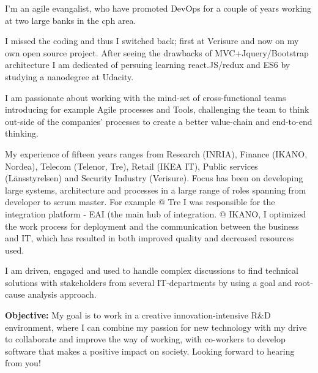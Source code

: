 I’m an agile evangalist, who have promoted DevOps for a couple of years working at two large banks in the cph area.  

I missed the coding and thus I switched back; first at Verisure and now on my own open source project. After seeing the drawbacks of MVC+Jquery/Bootstrap architecture I am dedicated of persuing learning react.JS/redux and ES6 by studying a nanodegree at Udacity. 

I am passionate about working with the mind-set of cross-functional teams introducing for example Agile processes and Tools, challenging the team to think out-side of the companies’ processes to create a better value-chain and end-to-end thinking. 

My experience of fifteen years ranges from Research (INRIA), Finance (IKANO, Nordea), Telecom (Telenor, Tre), Retail (IKEA IT), Public services (Länsstyrelsen) and Security Industry (Verisure). Focus has been on developing large systems, architecture and processes in a large range of roles spanning from developer to scrum master. For example @ Tre I was responsible for the integration platform - EAI (the main hub of integration. @ IKANO, I optimized the work process for deployment and the communication between the business and IT, which has resulted in both improved quality and decreased resources used. 

I am driven, engaged and used to handle complex discussions to find technical solutions with stakeholders from several IT-departments by using a goal and root-cause analysis approach. 


\newline\textbf{Objective:}
My goal is to work in a creative innovation-intensive R&D environment, where I can combine my passion for new technology with my drive to collaborate and improve the way of working,  with co-workers to develop software that makes a positive impact on society.
\newline
Looking forward to hearing from you!
\makeletterclosing